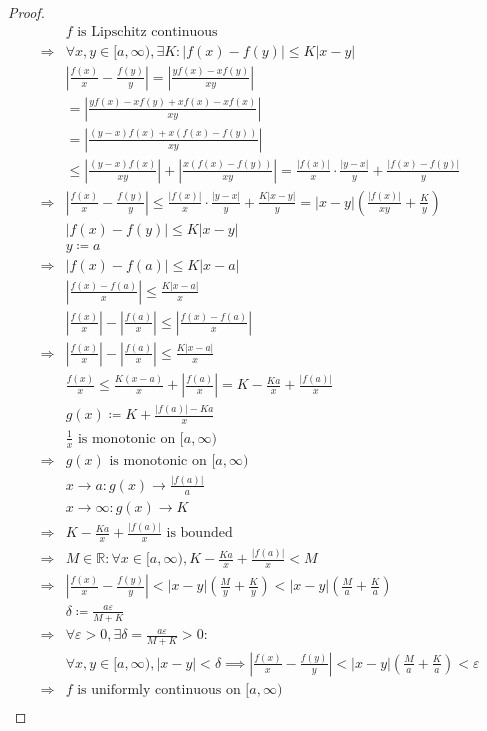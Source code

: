 \documentclass{article}
\begin{document}
\begin{proof}
    \begin{align*}
        &f\text{ is Lipschitz continuous}\\
        \Rightarrow&\forall x,y\in [a,\infty),\exists K:|f(x)-f(y)|\leqslant K|x-y|\\
        &\left|\frac{f(x)}{x}-\frac{f(y)}{y}\right|=\left|\frac{yf(x)-xf(y)}{xy}\right|\\
        &=\left|\frac{yf(x)-xf(y)+xf(x)-xf(x)}{xy}\right|\\
        &=\left|\frac{(y-x)f(x)+x(f(x)-f(y))}{xy}\right|\\
        &\leqslant\left|\frac{(y-x)f(x)}{xy}\right|+\left|\frac{x(f(x)-f(y))}{xy}\right|=\frac{|f(x)|}{x}\cdot \frac{|y-x|}{y}+\frac{|f(x)-f(y)|}{y}\\
        \Rightarrow&\left|\frac{f(x)}{x}-\frac{f(y)}{y}\right|\leqslant \frac{|f(x)|}{x}\cdot \frac{|y-x|}{y}+\frac{K|x-y|}{y}=|x-y|\left(\frac{|f(x)|}{xy}+\frac{K}{y}\right)\\
        &|f(x)-f(y)|\leqslant K|x-y|\\
        &y\coloneqq a\\
        \Rightarrow&|f(x)-f(a)|\leqslant K|x-a|\\
        &\left|\frac{f(x)-f(a)}{x}\right|\leqslant \frac{K|x-a|}{x}\\
        &\left|\frac{f(x)}{x}\right|-\left|\frac{f(a)}{x}\right|\leqslant\left|\frac{f(x)-f(a)}{x}\right|\\
        \Rightarrow&\left|\frac{f(x)}{x}\right|-\left|\frac{f(a)}{x}\right|\leqslant\frac{K|x-a|}{x}\\
        &\frac{f(x)}{x}\leqslant\frac{K(x-a)}{x}+\left|\frac{f(a)}{x}\right|=K-\frac{Ka}{x}+\frac{|f(a)|}{x}\\
        &g(x)\coloneqq K+\frac{|f(a)|-Ka}{x}\\
        &\frac{1}{x}\text{ is monotonic on }[a,\infty)\\
       \Rightarrow&g(x)\text{ is monotonic on }[a,\infty)\\
        &x\to a:g(x)\to\frac{|f(a)|}{a}\\
        &x\to \infty: g(x)\to K\\
        \Rightarrow&K-\frac{Ka}{x}+\frac{|f(a)|}{x}\text{ is bounded}\\
        \Rightarrow&M\in\mathbb{R}:\forall x\in [a,\infty),K-\frac{Ka}{x}+\frac{|f(a)|}{x}<M\\
        \Rightarrow&\left|\frac{f(x)}{x}-\frac{f(y)}{y}\right|<|x-y|\left(\frac{M}{y}+\frac{K}{y}\right)<|x-y|\left(\frac{M}{a}+\frac{K}{a}\right)\\
        &\delta\coloneqq \frac{a\varepsilon}{M+K}\\
        \Rightarrow&\forall \varepsilon>0,\exists \delta=\frac{a\varepsilon}{M+K}>0: \\
        &\forall x,y\in[a,\infty),|x-y|<\delta\implies\left|\frac{f(x)}{x}-\frac{f(y)}{y}\right|<|x-y|\left(\frac{M}{a}+\frac{K}{a}\right)<\varepsilon\\
        \Rightarrow&f\text{ is uniformly continuous on }[a,\infty)\\
    \end{align*}
\end{proof}
\end{document}
